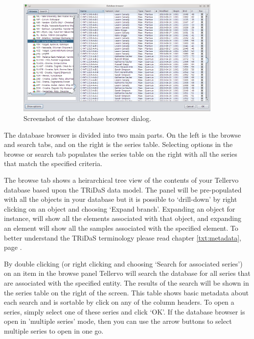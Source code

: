 \begin{figure}[hbtp]
  \centering
    \includegraphics[width=0.9\textwidth]{Images/dbbrowser.png}
    \caption{Screenshot of the database browser dialog.}
    \label{fig:dbbrowser}
\end{figure}

The database browser is divided into two main parts.  On the left is the browse and search tabs, and on the right is the series table.  Selecting options in the browse or search tab populates the series table on the right with all the series that match the specified criteria.  


The browse tab shows a heirarchical tree view of the contents of your Tellervo database based upon the TRiDaS data model.  The panel will be pre-populated with all the objects in your database but it is possible to `drill-down' by right clicking on an object and choosing `Expand branch'.  Expanding an object for instance, will show all the elements associated with that object, and expanding an element will show all the samples associated with the specified element.  To better understand the TRiDaS terminology please read chapter \ref{txt:metadata}, page \pageref{txt:metadata}.

By double clicking (or right clicking and choosing `Search for associated series') on an item in the browse panel Tellervo will search the database for all series that are associated with the specified entity.  The results of the search will be shown in the series table on the right of the screen.  This table shows basic metadata about each search and is sortable by click on any of the column headers.  To open a series, simply select one of these series and click `OK'.  If the database browser is open in 'multiple series' mode, then you can use the arrow buttons to select multiple series to open in one go.

